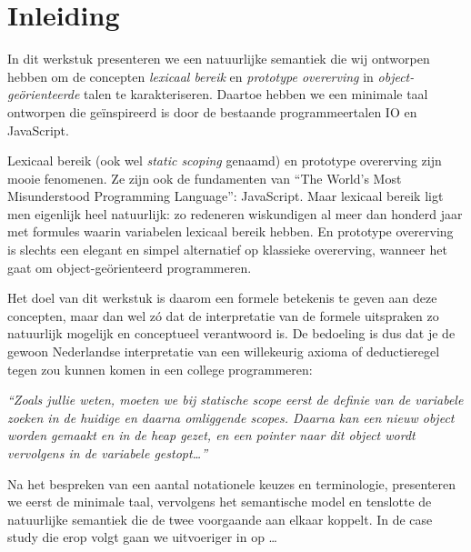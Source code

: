 
\chapter{Inleiding}

In dit werkstuk presenteren we een natuurlijke semantiek die wij ontworpen hebben om de concepten \emph{lexicaal bereik} en \emph{prototype overerving} in \emph{object-geörienteerde} talen te karakteriseren. Daartoe hebben we een minimale taal ontworpen die geïnspireerd is door de bestaande programmeertalen IO en JavaScript.

Lexicaal bereik (ook wel \emph{static scoping} genaamd) en prototype overerving zijn mooie fenomenen. Ze zijn ook de fundamenten van ``The World's Most Misunderstood Programming Language'': JavaScript. Maar lexicaal bereik ligt men eigenlijk heel natuurlijk: zo redeneren wiskundigen al meer dan honderd jaar met formules waarin variabelen lexicaal bereik hebben. En prototype overerving is slechts een elegant en simpel alternatief op klassieke overerving, wanneer het gaat om object-geörienteerd programmeren.

Het doel van dit werkstuk is daarom een formele betekenis te geven aan deze concepten, maar dan wel zó dat de interpretatie van de formele uitspraken zo natuurlijk mogelijk en conceptueel verantwoord is. De bedoeling is dus dat je de gewoon Nederlandse interpretatie van een willekeurig axioma of deductieregel tegen zou kunnen komen in een college programmeren:

\begin{multicols}{2}
  \small
  \raggedcolumns
  \setlength{\columnseprule}{.5pt}
  
  \columnbreak
  
  \textit{``Zoals jullie weten, moeten we bij statische scope eerst de definie van de variabele zoeken in de huidige en daarna omliggende scopes. Daarna kan een nieuw object worden gemaakt en in de heap gezet, en een \emph{pointer} naar dit object wordt vervolgens in de variabele gestopt\dots''}
\end{multicols}

Na het bespreken van een aantal notationele keuzes en terminologie, presenteren we eerst de minimale taal, vervolgens het semantische model en tenslotte de natuurlijke semantiek die de twee voorgaande aan elkaar koppelt. In de case study die erop volgt gaan we uitvoeriger in op \dots
